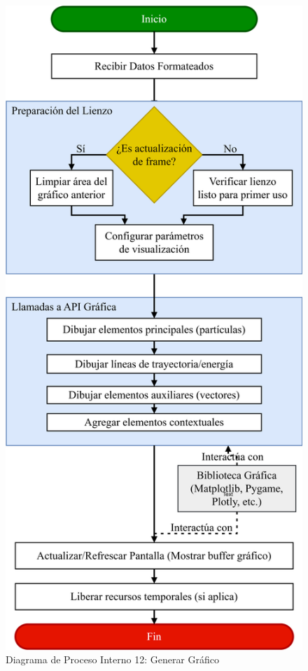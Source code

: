\begin{figure}[H]
    \centering
    \includegraphics[width=\textwidth]{img/Analisis/DiagramaProcesos/DiagramaProceso12_GenerarGrafico.png}
    \caption{Diagrama de Proceso Interno 12: Generar Gráfico}%
    \label{fig:process_diagram12}
\end{figure}

